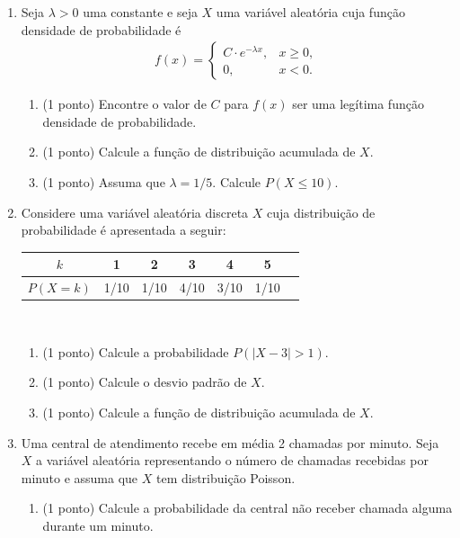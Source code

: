 \documentclass{article}
\begin{document}
\begin{enumerate}

\item Seja $\lambda > 0$ uma constante e seja $X$ uma variável aleatória cuja função densidade de probabilidade é 
\begin{align*}
f(x) = \begin{cases}
C \cdot e^{-\lambda x}, & x \geq 0, \\
0, & x < 0.
\end{cases}
\end{align*}
\begin{enumerate}
	\item (1 ponto) Encontre o valor de $C$ para $f(x)$ ser uma legítima função densidade de probabilidade.

	\item (1 ponto) Calcule a função de distribuição acumulada de $X$.
	
	\item (1 ponto) Assuma que $\lambda = 1/5$. Calcule $P(X \leq 10)$.
\end{enumerate}

% 
\item Considere uma variável aleatória discreta $X$ cuja distribuição de probabilidade é apresentada a seguir:
    \begin{center}
    \begin{tabular}{c|cccccc}
    \hline
    $k$ & 1 & 2 & 3 & 4 & 5 \\
    \hline
    $P(X=k)$ & 1/10 & 1/10 & 4/10 & 3/10 & 1/10 \\
    \hline
    \end{tabular}\\
    \end{center}
    \begin{enumerate}
    	\item (1 ponto) Calcule a probabilidade $P(|X-3|>1)$. 
    	\item (1 ponto) Calcule o desvio padrão de $X$.
    	\item (1 ponto) Calcule a função de distribuição acumulada de $X$.
    \end{enumerate}

\item Uma central de atendimento recebe em média 2 chamadas por minuto. Seja $X$ a variável aleatória representando o número de chamadas recebidas por minuto e assuma que $X$ tem distribuição Poisson. 
\begin{enumerate}
	\item (1 ponto) Calcule a probabilidade da central não receber chamada alguma durante um minuto.
	

\end{enumerate}
\end{enumerate}
\end{document}
